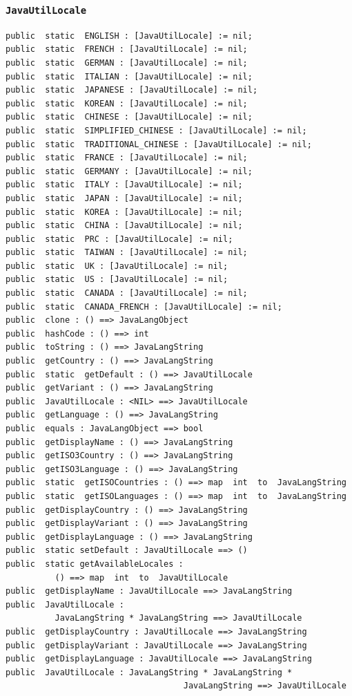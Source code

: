 \documentclass[\pformat,12pt]{article}
\begin{document}
\subsubsection{\texttt{JavaUtilLocale}}
\begin{small}
\begin{verbatim}
public  static  ENGLISH : [JavaUtilLocale] := nil;
public  static  FRENCH : [JavaUtilLocale] := nil;
public  static  GERMAN : [JavaUtilLocale] := nil;
public  static  ITALIAN : [JavaUtilLocale] := nil;
public  static  JAPANESE : [JavaUtilLocale] := nil;
public  static  KOREAN : [JavaUtilLocale] := nil;
public  static  CHINESE : [JavaUtilLocale] := nil;
public  static  SIMPLIFIED_CHINESE : [JavaUtilLocale] := nil;
public  static  TRADITIONAL_CHINESE : [JavaUtilLocale] := nil;
public  static  FRANCE : [JavaUtilLocale] := nil;
public  static  GERMANY : [JavaUtilLocale] := nil;
public  static  ITALY : [JavaUtilLocale] := nil;
public  static  JAPAN : [JavaUtilLocale] := nil;
public  static  KOREA : [JavaUtilLocale] := nil;
public  static  CHINA : [JavaUtilLocale] := nil;
public  static  PRC : [JavaUtilLocale] := nil;
public  static  TAIWAN : [JavaUtilLocale] := nil;
public  static  UK : [JavaUtilLocale] := nil;
public  static  US : [JavaUtilLocale] := nil;
public  static  CANADA : [JavaUtilLocale] := nil;
public  static  CANADA_FRENCH : [JavaUtilLocale] := nil;
public  clone : () ==> JavaLangObject
public  hashCode : () ==> int
public  toString : () ==> JavaLangString
public  getCountry : () ==> JavaLangString
public  static  getDefault : () ==> JavaUtilLocale
public  getVariant : () ==> JavaLangString
public  JavaUtilLocale : <NIL> ==> JavaUtilLocale
public  getLanguage : () ==> JavaLangString
public  equals : JavaLangObject ==> bool
public  getDisplayName : () ==> JavaLangString
public  getISO3Country : () ==> JavaLangString
public  getISO3Language : () ==> JavaLangString
public  static  getISOCountries : () ==> map  int  to  JavaLangString
public  static  getISOLanguages : () ==> map  int  to  JavaLangString
public  getDisplayCountry : () ==> JavaLangString
public  getDisplayVariant : () ==> JavaLangString
public  getDisplayLanguage : () ==> JavaLangString
public  static setDefault : JavaUtilLocale ==> ()
public  static getAvailableLocales : 
          () ==> map  int  to  JavaUtilLocale
public  getDisplayName : JavaUtilLocale ==> JavaLangString
public  JavaUtilLocale : 
          JavaLangString * JavaLangString ==> JavaUtilLocale
public  getDisplayCountry : JavaUtilLocale ==> JavaLangString
public  getDisplayVariant : JavaUtilLocale ==> JavaLangString
public  getDisplayLanguage : JavaUtilLocale ==> JavaLangString
public  JavaUtilLocale : JavaLangString * JavaLangString * 
                                    JavaLangString ==> JavaUtilLocale
\end{verbatim}
\end{small}
\end{document}

